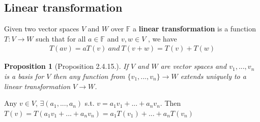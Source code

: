\documentclass[11pt,a4paper]{article}
\newtheorem{proposition}{Proposition}
\begin{document}
\subsection{Linear transformation}
Given two vector spaces $V$ and $W$ over $\mathbb{F}$ a \textbf{linear transformation} is a function $T : V \rightarrow	 W$ such that
for all $a \in \mathbb{F}$ and $v,w \in V$ , we have
\begin{equation}
    \begin{aligned}
        T(av)=aT(v)\ and\ T(v+w)=T(v)+T(w)
    \end{aligned}
    \nonumber
\end{equation}
\begin{proposition}[Proposition 2.4.15.]
    If $V$ and $W$ are vector spaces and $v_1,...,v_n$ is a basis for $V$ then any function
    from $\{v_1,...,v_n\}\rightarrow W$ extends \textit{uniquely} to a linear transformation $V \rightarrow W$.
\end{proposition}
Any $v\in V$, $\exists (a_1,...,a_n)$ s.t. $v=a_1 v_1+...+a_n v_n$. Then $T(v)=T(a_1 v_1+...+a_n v_n)=a_1T(v_1)+...+a_nT(v_n)$\\
\end{document}
